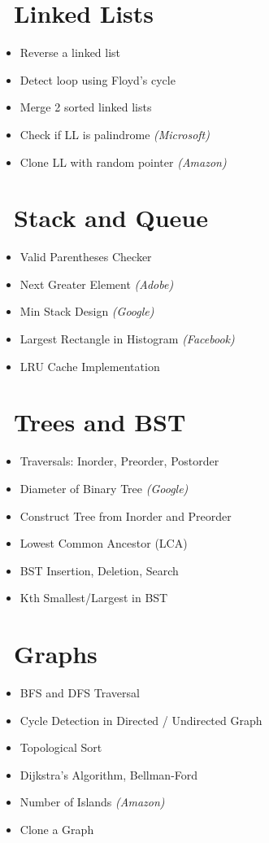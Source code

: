 \section*{\ Linked Lists}
\begin{itemize}
  \item Reverse a linked list
  \item Detect loop using Floyd’s cycle
  \item Merge 2 sorted linked lists
  \item Check if LL is palindrome \textit{(Microsoft)}
  \item Clone LL with random pointer \textit{(Amazon)}
\end{itemize}

\section*{\ Stack and Queue}
\begin{itemize}
  \item Valid Parentheses Checker
  \item Next Greater Element \textit{(Adobe)}
  \item Min Stack Design \textit{(Google)}
  \item Largest Rectangle in Histogram \textit{(Facebook)}
  \item LRU Cache Implementation
\end{itemize}

\section*{\ Trees and BST}
\begin{itemize}
  \item Traversals: Inorder, Preorder, Postorder
  \item Diameter of Binary Tree \textit{(Google)}
  \item Construct Tree from Inorder and Preorder
  \item Lowest Common Ancestor (LCA)
  \item BST Insertion, Deletion, Search
  \item Kth Smallest/Largest in BST
\end{itemize}

\section*{\ Graphs}
\begin{itemize}
  \item BFS and DFS Traversal
  \item Cycle Detection in Directed / Undirected Graph
  \item Topological Sort
  \item Dijkstra’s Algorithm, Bellman-Ford
  \item Number of Islands \textit{(Amazon)}
  \item Clone a Graph
\end{itemize}

